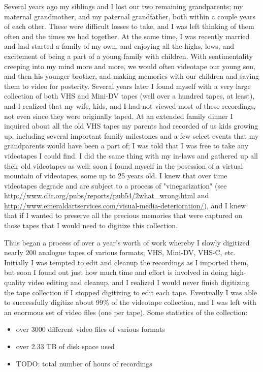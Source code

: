 Several years ago my siblings and I lost our two remaining grandparents; my maternal grandmother, and my paternal grandfather, both within a couple years of each other.  These were difficult losses to take, and I was left thinking of them often and the times we had together.  At the same time, I was recently married and had started a family of my own, and enjoying all the highs, lows, and excitement of being a part of a young family with children.  With sentimentality creeping into my mind more and more, we would often videotape our young son, and then his younger brother, and making memories with our children and saving them to video for posterity.  Several years later I found myself with a very large collection of both VHS and Mini-DV tapes (well over a hundred tapes, at least), and I realized that my wife, kids, and I had not viewed most of these recordings, not even since they were originally taped.  At an extended family dinner I inquired about all the old VHS tapes my parents had recorded of us kids growing up, including several important family milestones and a few select events that my grandparents would have been a part of; I was told that I was free to take any videotapes I could find.  I did the same thing with my in-laws and gathered up all their old videotapes as well; soon I found myself in the posession of a virtual mountain of videotapes, some up to 25 years old.  I knew that over time videotapes degrade and are subject to a process of "vinegarization" (see \url{http://www.clir.org/pubs/reports/pub54/2what_wrong.html} and \url{http://www.emeraldartservices.com/visual-media-deterioration/}), and I knew that if I wanted to preserve all the precious memories that were captured on those tapes that I would need to digitize this collection.

Thus began a process of over a year's worth of work whereby I slowly digitized nearly 200 analogue tapes of various formats; VHS, Mini-DV, VHS-C, etc.  Initially I was tempted to edit and cleanup the recordings as I imported them, but soon I found out just how much time and effort is involved in doing high-quality video editing and cleanup, and I realized I would never finish digitizing the tape collection if I stopped digitizing to edit each tape.  Eventually I was able to successfully digitize about 99\% of the videotape collection, and I was left with an enormous set of video files (one per tape).  Some statistics of the collection:

\begin{itemize}
\item over 3000 different video files of various formats
\item over 2.33 TB of disk space used
\item TODO: total number of hours of recordings
\end{itemize}

